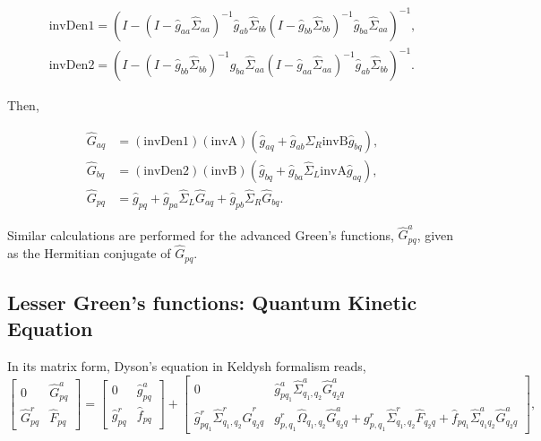 \documentclass[10pt,prb,showpacs,amssymb,floatfix]{revtex4-1}
\newcommand{\tx}{\text}
\newcommand{\Og}{\Omega}
\newcommand{\Sg}{\Sigma}
\newcommand{\h}{\hat}
\begin{document}
 \begin{align}
 \tx{invDen1} = (I-(I-\h g_{aa}\h \Sg_{aa})^{-1}\h g_{ab}\h \Sg_{bb}(I-\h g_{bb}\h \Sg_{bb})^{-1}\h g_{ba}\h \Sg_{aa})^{-1}, \\
 \tx{invDen2} =  (I-(I-\h g_{bb}\h \Sg_{bb})^{-1}\h g_{ba}\h \Sg_{aa}(I-\h g_{aa}\h \Sg_{aa})^{-1}\h g_{ab}\h \Sg_{bb})^{-1}.
 \end{align}

Then,

 \begin{align}
\label{eq:nino}
{\hat G}_{aq}&= (\tx{invDen1})(\tx{invA})(\h g_{aq} + \h g_{ab} \h \Sg_R \tx{invB}\h g_{bq}), \\
{\hat G}_{bq}&= (\tx{invDen2})(\tx{invB})(\h g_{bq} + \h g_{ba} \h \Sg_L \tx{invA}\h g_{aq}), \\
{\hat G}_{pq}& ={\hat g}_{pq}+{\hat g}_{pa}{\hat \Sg}_{L}{\hat G}_{aq}+{\hat g}_{pb}{\hat \Sg}_{R}{\hat G}_{bq}.
\label{eq:nino2}
\end{align}

Similar calculations are performed for the advanced Green's functions,  ${\hat {G}}^a_{pq}$, given as the Hermitian conjugate of $\h G_{pq}$.


\subsection{Lesser Green's functions: Quantum Kinetic Equation}

In its matrix form, Dyson's equation in Keldysh formalism reads, \cite{keldysh}
\begin{equation}
\left[ {\begin{array}{cc}
0 & \h{G}^a_{pq} \\
\h G^r_{pq} & \h F_{pq}
\end{array}} \right] = \left[ {\begin{array}{cc}
0 & \h{g}^a_{pq} \\
\h g^r_{pq} & \h f_{pq}
\end{array}} \right] + 
\left[ {\begin{array}{cc}
0 & \h{g}^a_{pq_1}\h {\Sg}^a_{q_1,q_2} \h{G}^a_{q_2 q} \\
\h{g}^r_{pq_1}\h {\Sg}^r_{q_1,q_2} \h{G}^r_{q_2 q}     &  g^r_{p,q_1} \h \Og_{q_1,q_2} \h G^a_{q_2 q}  + g^r_{p,q_1} \h \Sg^r_{q_1,q_2} \h F_{q_2 q} + \h f_{pq_1} \h \Sg^a_{q_1q_2} \h{G}^a_{q_2 q}
\end{array}} \right],
\end{equation}
\end{document}
